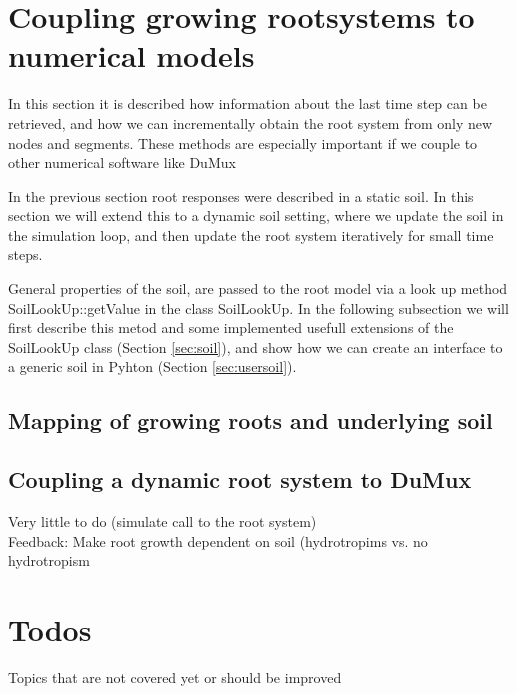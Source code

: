 \newpage
\section{Coupling growing rootsystems to numerical models} \label{sec:growing}


In this section it is described how information about the last time step can be retrieved, 
and how we can incrementally obtain the root system from only new nodes and segments. 
These methods are especially important if we couple to other numerical software like DuMux


In the previous section root responses were described in a static soil. 
In this section we will extend this to a dynamic soil setting, where we update the soil in the simulation loop, and then update the root system iteratively for small time steps. 

General properties of the soil, are passed to the root model via a look up method SoilLookUp::getValue in the class SoilLookUp. 
In the following subsection we will first describe this metod and some implemented usefull extensions of the SoilLookUp class (Section \ref{sec:soil}), 
and show how we can create an interface to a generic soil in Pyhton (Section \ref{sec:usersoil}). 

\subsection{Mapping of growing roots and underlying soil} 





\subsection{Coupling a dynamic root system to DuMux} \label{sec:dumux_dyn_coupling}

Very little to do (simulate call to the root system) \\

Feedback: Make root growth dependent on soil (hydrotropims vs. no hydrotropism

\section{Todos}
Topics that are not covered yet or should be improved

